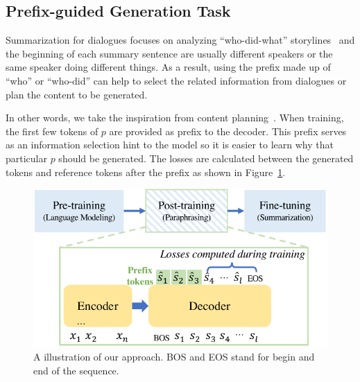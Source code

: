 \subsection{Prefix-guided Generation Task}
\label{sec:pgg}
%
Summarization for dialogues focuses on analyzing ``who-did-what'' storylines~\cite{chen2021structure} and the beginning of each summary sentence are usually different speakers or the same speaker doing different things. As a result,  using the prefix made up of ``who'' or ``who-did'' can help to select the related information from dialogues or plan the content to be generated.

In other words, we take the inspiration from content 
planning~\cite{narayan2021planning,wu-etal-2021-controllable}. 
When training, the first few tokens of $p$ are provided as prefix to 
the decoder. This prefix serves as an information selection hint to 
the model so it is easier to learn why that particular $p$ should be 
generated. 
The losses are calculated between the generated tokens and reference 
tokens after the prefix as shown in Figure~\ref{fig:pgg}. 
\begin{figure}[th]
	\centering
	\includegraphics[width=0.75\columnwidth]{pgg.pdf}
	\caption{A illustration of our approach. 
BOS and EOS stand for begin and end of the sequence.}
	\label{fig:pgg}
\end{figure}

